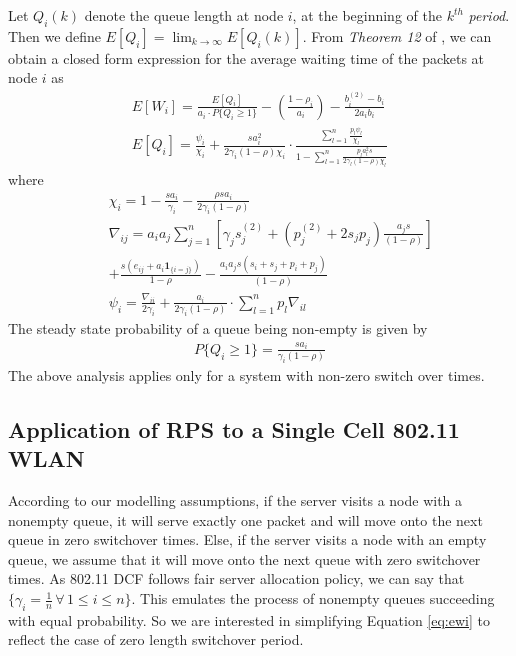 \documentclass[10pt, conference, compsocconf]{IEEEtran}
\begin{document}
Let $Q_i(k)$ denote the queue length at node $i$, at the beginning of the $k^{th}$ \emph{period}. Then we define $E[Q_i] = \displaystyle \lim_{k \to \infty} E[Q_i(k)]$. From \textit{Theorem 12} of \cite{lee}, we can obtain a closed form expression for the average waiting time of the packets at node $i$ as
\begin{eqnarray} 
E[W_i] = \frac{E[Q_i]}{a_i \cdot P\{Q_i \geq 1 \}} - \left(\frac{1-\rho_i}{a_i}\right) -\frac{b^{(2)}_{i}- b_{i}}{2a_i b_{i}} \label{eq:ewi} \\
E[Q_i] = \frac{\psi_i}{\chi_i} + \frac{s  a^2_i}{2\gamma_i (1-\rho) \chi_i} \cdot \frac{\sum^{n}_{l=1} \displaystyle \frac{p_l \psi_l}{\chi_l}}{1 - \sum^{n}_{l=1} \displaystyle \frac{p_l a^2_l s}{2\gamma_l(1-\rho)\chi_l}}  \label{eq:eqi}
\end{eqnarray}
where
\begin{eqnarray} 
&& \chi_i = 1 - \frac{s a_i}{\gamma_i} - \frac{\rho s a_i}{2\gamma_i(1-\rho)} \label{eq:chi} \nonumber \\
&& \nabla_{ij} = a_i a_j \sum^{n}_{j=1} \left[ \gamma_j s^{(2)}_j + (p^{(2)}_j + 2s_jp_j)\frac{a_j s}{(1-\rho)} \right] \label{eq:nabla} \\
&& +\frac{s (e_{ij}+a_i\boldsymbol 1_{\{ i=j\}})}{1-\rho}- \frac{a_ia_js (s_i + s_j + p_i + p_j)}{(1-\rho)} \nonumber \\
&& \psi_i = \frac{\nabla_{ii}}{2 \gamma_i} + \frac{a_i}{2\gamma_i(1-\rho)} \cdot \sum^{n}_{l=1} p_l \nabla_{il} \label{eq:psi} \nonumber 
\end{eqnarray}
The steady state probability of a queue being non-empty is given by
\begin{eqnarray} \label{eq:pqi}
P\{Q_i \geq 1 \} = \frac{sa_i}{\gamma_i(1-\rho)} 
\end{eqnarray}
The above analysis applies only for a system with non-zero switch over times. 

\subsection{Application of RPS to a Single Cell 802.11 WLAN}
According to our modelling assumptions, if the server visits a node with a nonempty queue, it will serve exactly one packet and will move onto the next queue in zero switchover times. Else, if the server visits a node with an empty queue, we assume that it will move onto the next queue with zero switchover times. As 802.11 DCF follows fair server allocation policy, we can say that $\{ \gamma_i=\frac{1}{n} \, \forall \, 1\leq i\leq n\}$. This emulates the process of nonempty queues succeeding with equal probability. So we are interested in simplifying Equation \eqref{eq:ewi} to reflect the case of zero length switchover period. 
\end{document}
